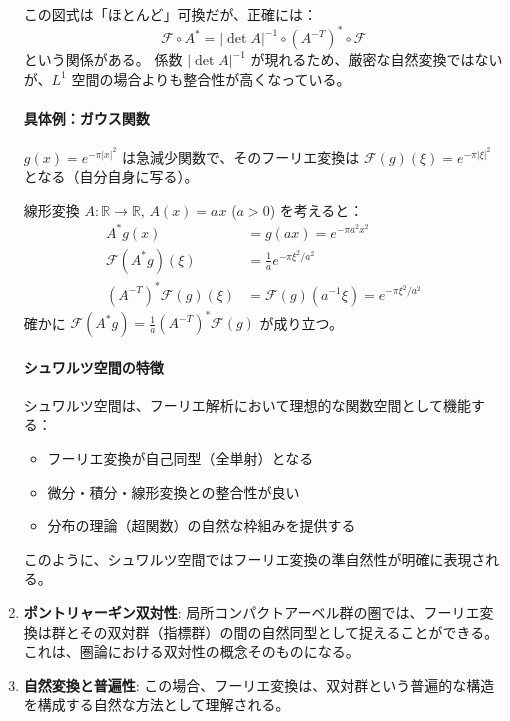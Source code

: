 \documentclass[uplatex,a4j,12pt,dvipdfmx]{jsarticle}
\begin{document}
\begin{enumerate}
	      この図式は「ほとんど」可換だが、正確には：
	      \[
		      \mathcal{F} \circ A^* = |\det A|^{-1} \circ (A^{-T})^* \circ \mathcal{F}
	      \]
	      という関係がある。
	      係数 $|\det A|^{-1}$ が現れるため、厳密な自然変換ではないが、$L^1$ 空間の場合よりも整合性が高くなっている。


	      \paragraph{具体例：ガウス関数}
	      $g(x) = e^{-\pi |x|^2}$ は急減少関数で、そのフーリエ変換は $\mathcal{F}(g)(\xi) = e^{-\pi |\xi|^2}$ となる（自分自身に写る）。

	      線形変換 $A: \mathbb{R} \to \mathbb{R}$, $A(x) = ax$ ($a > 0$) を考えると：
	      \begin{align*}
		      A^*g(x)                       & = g(ax) = e^{-\pi a^2 x^2}                       \\
		      \mathcal{F}(A^*g)(\xi)        & = \frac{1}{a} e^{-\pi \xi^2/a^2}                 \\
		      (A^{-T})^*\mathcal{F}(g)(\xi) & = \mathcal{F}(g)(a^{-1}\xi) = e^{-\pi \xi^2/a^2}
	      \end{align*}
	      確かに $\mathcal{F}(A^*g) = \frac{1}{a} (A^{-T})^*\mathcal{F}(g)$ が成り立つ。


	      \paragraph{シュワルツ空間の特徴}
	      シュワルツ空間は、フーリエ解析において理想的な関数空間として機能する：
	      \begin{itemize}
		      \item フーリエ変換が自己同型（全単射）となる
		      \item 微分・積分・線形変換との整合性が良い
		      \item 分布の理論（超関数）の自然な枠組みを提供する
	      \end{itemize}

	      このように、シュワルツ空間ではフーリエ変換の準自然性が明確に表現される。
	\item \textbf{ポントリャーギン双対性}:
	      局所コンパクトアーベル群の圏では、フーリエ変換は群とその双対群（指標群）の間の自然同型として捉えることができる。これは、圏論における双対性の概念そのものになる。

	\item \textbf{自然変換と普遍性}:
	      この場合、フーリエ変換は、双対群という普遍的な構造を構成する自然な方法として理解される。

\end{enumerate}
\end{document}

